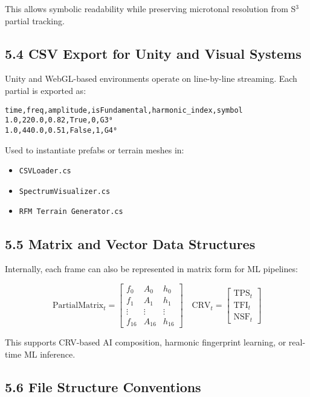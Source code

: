 This allows symbolic readability while preserving microtonal resolution from S$^{3}$ partial tracking.

\subsection*{5.4 CSV Export for Unity and Visual Systems}

Unity and WebGL-based environments operate on line-by-line streaming. Each partial is exported as:

\begin{verbatim}
time,freq,amplitude,isFundamental,harmonic_index,symbol
1.0,220.0,0.82,True,0,G3⁰
1.0,440.0,0.51,False,1,G4⁰
\end{verbatim}

Used to instantiate prefabs or terrain meshes in:

\begin{itemize}
    \item \texttt{CSVLoader.cs}
    \item \texttt{SpectrumVisualizer.cs}
    \item \texttt{RFM Terrain Generator.cs}
\end{itemize}

\subsection*{5.5 Matrix and Vector Data Structures}

Internally, each frame can also be represented in matrix form for ML pipelines:

\[
\text{PartialMatrix}_t = 
\begin{bmatrix}
f_0 & A_0 & h_0 \\
f_1 & A_1 & h_1 \\
\vdots & \vdots & \vdots \\
f_{16} & A_{16} & h_{16}
\end{bmatrix}
\quad
\text{CRV}_t = 
\begin{bmatrix}
\text{TPS}_t \\
\text{TFI}_t \\
\text{NSF}_t
\end{bmatrix}
\]

This supports CRV-based AI composition, harmonic fingerprint learning, or real-time ML inference.

\subsection*{5.6 File Structure Conventions}

